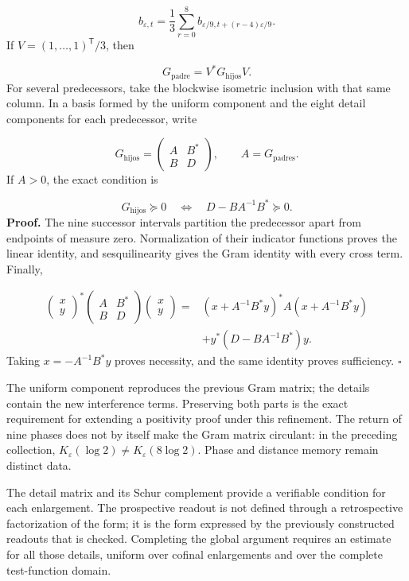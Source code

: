 \[
b_{\varepsilon,t}=\frac13\sum_{r=0}^8
b_{\varepsilon/9,t+(r-4)\varepsilon/9}.
\]
If \(V=(1,\ldots,1)^{\mathsf T}/3\), then

\[
G_{\mathrm{padre}}=V^*G_{\mathrm{hijos}}V.
\]
For several predecessors, take the blockwise isometric inclusion with that same column. In a basis formed by the uniform component and the eight detail components for each predecessor, write

\[
G_{\mathrm{hijos}}=
\begin{pmatrix}A&B^*\\B&D\end{pmatrix},\qquad
A=G_{\mathrm{padres}}.
\]
If \(A>0\), the exact condition is

\[
G_{\mathrm{hijos}}\succeq0
\quad\Longleftrightarrow\quad D-BA^{-1}B^*\succeq0.
\]
\textbf{Proof.} The nine successor intervals partition the predecessor apart from endpoints of measure zero. Normalization of their indicator functions proves the linear identity, and sesquilinearity gives the Gram identity with every cross term. Finally,

\[
\begin{aligned}
\begin{pmatrix}x\\y\end{pmatrix}^*
\begin{pmatrix}A&B^*\\B&D\end{pmatrix}
\begin{pmatrix}x\\y\end{pmatrix}
={}&(x+A^{-1}B^*y)^*A(x+A^{-1}B^*y)\\
&+y^*(D-BA^{-1}B^*)y.
\end{aligned}
\]
Taking \(x=-A^{-1}B^*y\) proves necessity, and the same identity proves sufficiency. \hfill\(\square\)

The uniform component reproduces the previous Gram matrix; the details contain the new interference terms. Preserving both parts is the exact requirement for extending a positivity proof under this refinement. The return of nine phases does not by itself make the Gram matrix circulant: in the preceding collection, \(K_\varepsilon(\log2)\neq K_\varepsilon(8\log2)\). Phase and distance memory remain distinct data.

The detail matrix and its Schur complement provide a verifiable condition for each enlargement. The prospective readout is not defined through a retrospective factorization of the form; it is the form expressed by the previously constructed readouts that is checked. Completing the global argument requires an estimate for all those details, uniform over cofinal enlargements and over the complete test-function domain.

